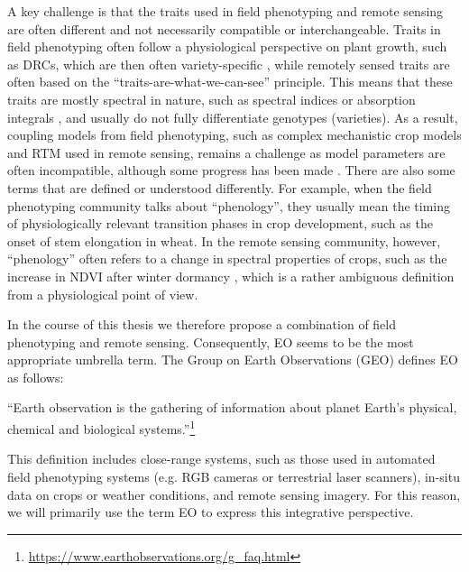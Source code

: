 A key challenge is that the traits used in field phenotyping and remote sensing are often different and not necessarily compatible or interchangeable. Traits in field phenotyping often follow a physiological perspective on plant growth, such as \gls{DRC}s, which are then often variety-specific \citep{roth_field_2023}, while remotely sensed traits are often based on the ``traits-are-what-we-can-see'' principle. This means that these traits are mostly spectral in nature, such as spectral indices \cite{bannari_review_1995} or absorption integrals \citep[for example]{wocher_rtm-based_2020}, and usually do not fully differentiate genotypes (varieties). As a result, coupling models from field phenotyping, such as complex mechanistic crop models and \gls{RTM} used in remote sensing, remains a challenge as model parameters are often incompatible, although some progress has been made \citep[for example]{thorp_estimating_2012}. There are also some terms that are defined or understood differently. For example, when the field phenotyping community talks about ``phenology'', they usually mean the timing of physiologically relevant transition phases in crop development, such as the onset of stem elongation in wheat. In the remote sensing community, however, ``phenology'' often refers to a change in spectral properties of crops, such as the increase in \gls{NDVI} after winter dormancy \citep{de_beurs_land_2004}, which is a rather ambiguous definition from a physiological point of view.

In the course of this thesis we therefore propose a combination of field phenotyping and remote sensing. Consequently, \gls{EO} seems to be the most appropriate umbrella term. The Group on Earth Observations (GEO) defines \gls{EO} as follows:
\begin{displayquote}
``Earth observation is the gathering of information about planet Earth's physical, chemical and biological systems.''\footnote{\url{https://www.earthobservations.org/g_faq.html}}
\end{displayquote}
This definition includes close-range systems, such as those used in automated field phenotyping systems (e.g. RGB cameras or terrestrial laser scanners), in-situ data on crops or weather conditions, and remote sensing imagery. For this reason, we will primarily use the term \gls{EO} to express this integrative perspective.

